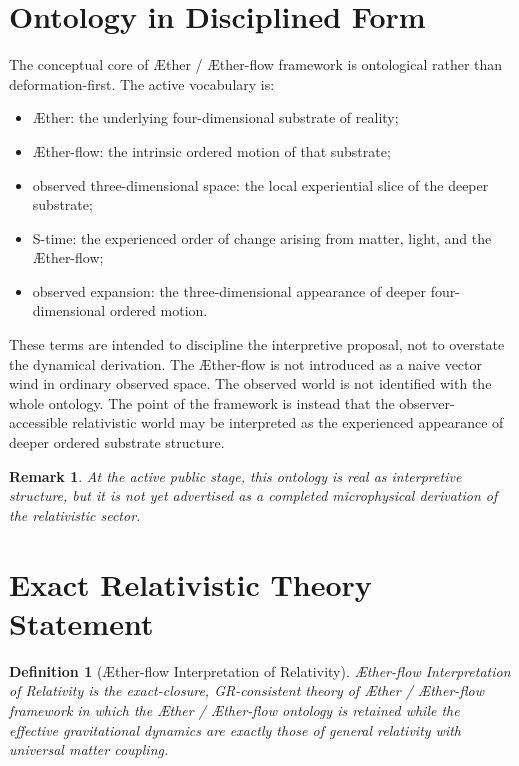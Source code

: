 \documentclass[11pt]{article}
\newcommand{\Aether}{\AE{}ther}
\newcommand{\Aflow}{\AE{}ther-flow}
\newcommand{\TheoryName}{\Aflow{} Interpretation of Relativity}
\newcommand{\TheoryProgram}{\Aether{} / \Aflow{} framework}
\newtheorem{definition}{Definition}
\newtheorem{remark}{Remark}
\begin{document}
\section{Ontology in Disciplined Form}

The conceptual core of \TheoryProgram{} is ontological rather than deformation-first. The active vocabulary is:
\begin{itemize}
    \item \Aether{}: the underlying four-dimensional substrate of reality;
    \item \Aflow{}: the intrinsic ordered motion of that substrate;
    \item observed three-dimensional space: the local experiential slice of the deeper substrate;
    \item S-time: the experienced order of change arising from matter, light, and the \Aflow{};
    \item observed expansion: the three-dimensional appearance of deeper four-dimensional ordered motion.
\end{itemize}

These terms are intended to discipline the interpretive proposal, not to overstate the dynamical derivation. The \Aflow{} is not introduced as a naive vector wind in ordinary observed space. The observed world is not identified with the whole ontology. The point of the framework is instead that the observer-accessible relativistic world may be interpreted as the experienced appearance of deeper ordered substrate structure.

\begin{remark}
At the active public stage, this ontology is real as interpretive structure, but it is not yet advertised as a completed microphysical derivation of the relativistic sector.
\end{remark}

\section{Exact Relativistic Theory Statement}

\begin{definition}[\TheoryName{}]
\TheoryName{} is the exact-closure, GR-consistent theory of \TheoryProgram{} in which the \Aether{} / \Aflow{} ontology is retained while the effective gravitational dynamics are exactly those of general relativity with universal matter coupling.
\end{definition}
\end{document}
